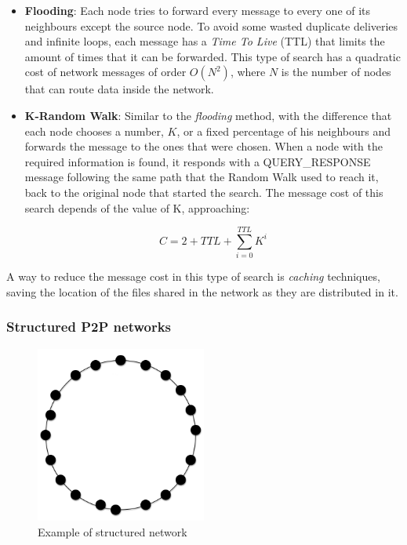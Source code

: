 \begin{itemize}
    \item \textbf{Flooding}: 
Each node tries to forward every message to every one of its neighbours except
the source node. To avoid some wasted duplicate deliveries and infinite loops,
each message has a \textit{Time To Live} (TTL) that limits the amount of times
that it can be forwarded. This type of search has a quadratic cost of network
messages of order $O(N^2)$, where $N$ is the number of nodes that can route data
inside the network.
    \item \textbf{K-Random Walk}: Similar to the \textit{flooding} method, with
the difference that each node chooses a number, $K$, or a fixed percentage of his
neighbours and forwards the message to the ones that were chosen. When a node
with the required information is found, it responds with a QUERY\_RESPONSE
message following the same path that the Random Walk used to reach it, back to
the original node that started the search. The message cost of this search
depends of the value of K, approaching:

\begin{equation}
\label{eq:krandomwalk}
 C = 2 + TTL +
\sum_{i=0}^{TTL} K^i
\end{equation}

\end{itemize}

A way to reduce the message cost in this type of search is \textit{caching}
techniques, saving the location of the files shared in the network
as they are distributed in it.

\subsubsection{Structured P2P networks}
\label{sec:p2p_estructured}

\begin{figure}
\center
\includegraphics[width=0.5\textwidth]{img/p2p-structured}
\caption{Example of structured network}
\label{fig:p2p_estructured}
\end{figure}


